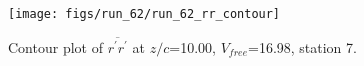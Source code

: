 \begin{figure}[H]
\centering
\texttt{[image: figs/run\_62/run\_62\_rr\_contour]}
\caption{Contour plot of $\overline{r^\prime r^\prime}$ at $z/c$=10.00, $V_{free}$=16.98, station 7.}
\end{figure}


